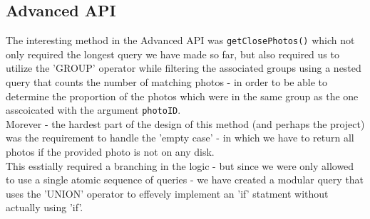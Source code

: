 \subsection{Advanced API}
The interesting method in the Advanced API was \texttt{getClosePhotos()}
which not only required the longest query we have made so far,
but also required us to utilize the 'GROUP'
operator while filtering the associated groups using a nested
query that counts the number of matching photos - in order to be 
able to determine the proportion of the photos which were in the same group
as the one asscoicated with the argument \texttt{photoID}.\\
Morever - the hardest part of the design of this method (and perhaps the project)
was the requirement to handle the 'empty case' - in which 
we have to return all photos if the provided photo is not on any disk.\\
This esstially required a branching in the logic - but since
we were only allowed to use a single atomic sequence of queries -
we have created a modular query that uses the 'UNION' operator
to effevely implement an 'if' statment without actually using 'if'.